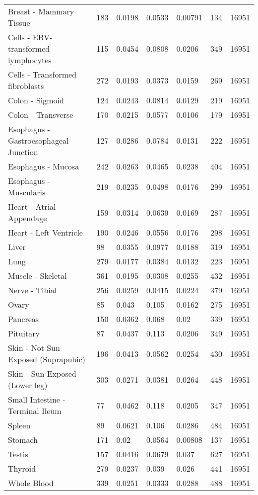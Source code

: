 \documentclass[10pt,letterpaper]{article}
\begin{document}
\begin{table}[!ht]
\begin{adjustwidth}{-2.25in}{0in}
\begin{tabular}{lllllll}
  Breast - Mammary Tissue & 183 & 0.0198 & 0.0533 & 0.00791 & 134 & 16951 \\ 
  Cells - EBV-transformed lymphocytes & 115 & 0.0454 & 0.0808 & 0.0206 & 349 & 16951 \\ 
  Cells - Transformed fibroblasts & 272 & 0.0193 & 0.0373 & 0.0159 & 269 & 16951 \\ 
  Colon - Sigmoid & 124 & 0.0243 & 0.0814 & 0.0129 & 219 & 16951 \\ 
  Colon - Transverse & 170 & 0.0215 & 0.0577 & 0.0106 & 179 & 16951 \\ 
  Esophagus - Gastroesophageal Junction & 127 & 0.0286 & 0.0784 & 0.0131 & 222 & 16951 \\ 
  Esophagus - Mucosa & 242 & 0.0263 & 0.0465 & 0.0238 & 404 & 16951 \\ 
  Esophagus - Muscularis & 219 & 0.0235 & 0.0498 & 0.0176 & 299 & 16951 \\ 
  Heart - Atrial Appendage & 159 & 0.0314 & 0.0639 & 0.0169 & 287 & 16951 \\ 
  Heart - Left Ventricle & 190 & 0.0246 & 0.0556 & 0.0176 & 298 & 16951 \\ 
  Liver & 98 & 0.0355 & 0.0977 & 0.0188 & 319 & 16951 \\ 
  Lung & 279 & 0.0177 & 0.0384 & 0.0132 & 223 & 16951 \\ 
  Muscle - Skeletal & 361 & 0.0195 & 0.0308 & 0.0255 & 432 & 16951 \\ 
  Nerve - Tibial & 256 & 0.0259 & 0.0415 & 0.0224 & 379 & 16951 \\ 
  Ovary & 85 & 0.043 & 0.105 & 0.0162 & 275 & 16951 \\ 
  Pancreas & 150 & 0.0362 & 0.068 & 0.02 & 339 & 16951 \\ 
  Pituitary & 87 & 0.0437 & 0.113 & 0.0206 & 349 & 16951 \\ 
  Skin - Not Sun Exposed (Suprapubic) & 196 & 0.0413 & 0.0562 & 0.0254 & 430 & 16951 \\ 
  Skin - Sun Exposed (Lower leg) & 303 & 0.0271 & 0.0381 & 0.0264 & 448 & 16951 \\ 
  Small Intestine - Terminal Ileum & 77 & 0.0462 & 0.118 & 0.0205 & 347 & 16951 \\ 
  Spleen & 89 & 0.0621 & 0.106 & 0.0286 & 484 & 16951 \\ 
  Stomach & 171 & 0.02 & 0.0564 & 0.00808 & 137 & 16951 \\ 
  Testis & 157 & 0.0416 & 0.0679 & 0.037 & 627 & 16951 \\ 
  Thyroid & 279 & 0.0237 & 0.039 & 0.026 & 441 & 16951 \\ 
  Whole Blood & 339 & 0.0251 & 0.0333 & 0.0288 & 488 & 16951 \\ 
   \hline
\end{tabular}
\end{adjustwidth}
\end{table}
\end{document}

